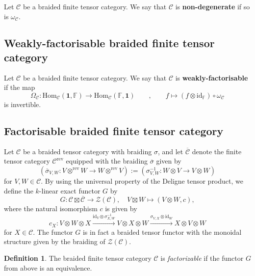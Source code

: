 \documentclass[11pt]{article}
\newcommand{\Hom}{\mathrm{Hom}}
\newcommand{\C}{\mathcal{C}}
\newcommand{\F}{\mathbb{F}}
\newcommand{\one}{\mathbf{1}}
\newcommand{\id}{\mathrm{id}}
\theoremstyle{definition}
\newtheorem{definition}[theorem]{Definition}
\begin{document}
Let $\C$ be a  braided finite tensor category. We say that $\C$ is \textbf{non-degenerate} if so is $\omega_\C$.



\subsection{Weakly-factorisable braided finite tensor category}

Let $\C$ be a  braided finite tensor category. We say that $\C$ is \textbf{weakly-factorisable} if the map $$ \Omega_\C : \Hom_\C (\one, \F) \to \Hom_\C (\F, \one)  \qquad , \qquad f \mapsto (f \otimes \id_\F)\circ \omega_\C $$
is invertible.



\subsection{Factorisable braided finite tensor category}



Let $\mathcal{C}$ be a braided tensor category with braiding $\sigma$, and let
$\overline{\mathcal{C}}$ denote the finite tensor category $\mathcal{C}^{\mathrm{rev}}$ equipped with the braiding $\overline{\sigma}$ given by
\[
(\overline{\sigma}_{V,W} : V \otimes^{\mathrm{rev}} W \to W \otimes^{\mathrm{rev}} V)
:= (\sigma_{V,W}^{-1} : W \otimes V \to V \otimes W)
\]
for $V, W \in \mathcal{C}$. By using the universal property of the Deligne tensor product, we
define the $k$-linear exact functor $G$ by
\begin{equation}
G : \mathcal{C} \boxtimes \overline{\mathcal{C}} \to \mathcal{Z}(\mathcal{C}), \quad V \boxtimes W \mapsto (V \otimes W, c), \tag{3.10}
\end{equation}
where the natural isomorphism $c$ is given by
\begin{equation}
c_X : V \otimes W \otimes X
\xrightarrow{\mathrm{id}_V \otimes \sigma_{X,W}^{-1}}
V \otimes X \otimes W
\xrightarrow{\sigma_{V,X} \otimes \mathrm{id}_W}
X \otimes V \otimes W \tag{3.11}
\end{equation}
for $X \in \mathcal{C}$. The functor $G$ is in fact a braided tensor functor with the monoidal
structure given by the braiding of $\mathcal{Z}(\mathcal{C})$.

\begin{definition}
The braided finite tensor category $\mathcal{C}$ is \emph{factorizable} if the functor $G$ from above is an equivalence.
\end{definition}
\end{document}
